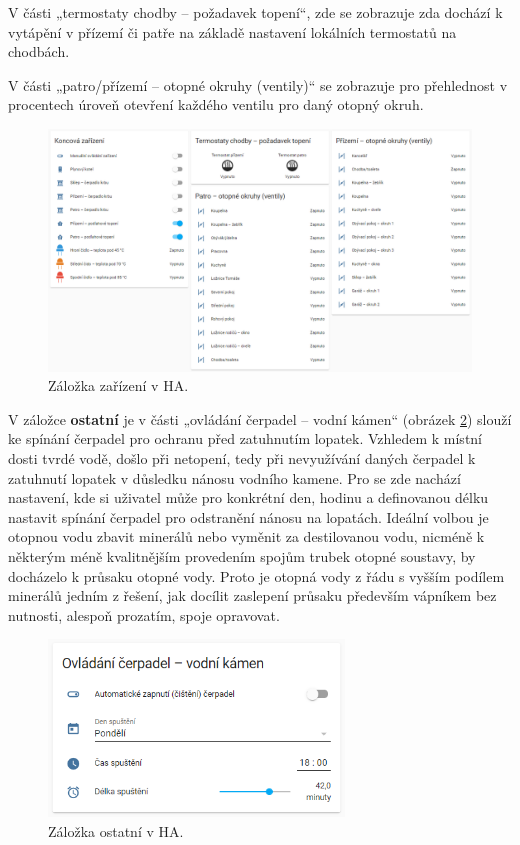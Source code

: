 V části „termostaty chodby – požadavek topení“, zde se zobrazuje zda dochází k vytápění v přízemí či patře na základě nastavení lokálních termostatů na chodbách.

V části „patro/přízemí – otopné okruhy (ventily)“ se zobrazuje pro přehlednost v procentech úroveň otevření každého ventilu pro daný otopný okruh.

\begin{figure}[H]
    \centering
    \includegraphics[width=\textwidth]{images/software-ha/zalozka-zarizeni.png}
    \caption{Záložka zařízení v HA.}
    \label{fig:zalozka-zarizeni}
\end{figure}

V záložce \textbf{ostatní} je v části „ovládání čerpadel – vodní kámen“ (obrázek \ref{fig:zalozka-ostatni}) slouží ke spínání čerpadel pro ochranu před zatuhnutím lopatek. Vzhledem k místní dosti tvrdé vodě, došlo při netopení, tedy při nevyužívání daných čerpadel k zatuhnutí lopatek v důsledku nánosu vodního kamene. Pro se zde nachází nastavení, kde si uživatel může pro konkrétní den, hodinu a definovanou délku nastavit spínání čerpadel pro odstranění nánosu na lopatách. Ideální volbou je otopnou vodu zbavit minerálů nebo vyměnit za destilovanou vodu, nicméně k některým méně kvalitnějším provedením spojům trubek otopné soustavy, by docházelo k průsaku otopné vody. Proto je otopná vody z řádu s vyšším podílem minerálů jedním z řešení, jak docílit zaslepení průsaku především vápníkem bez nutnosti, alespoň prozatím, spoje opravovat.

\begin{figure}[H]
    \centering
    \includegraphics[width=0.7\textwidth]{images/software-ha/zalozka-ostatni.png}
    \caption{Záložka ostatní v HA.}
    \label{fig:zalozka-ostatni}
\end{figure}


